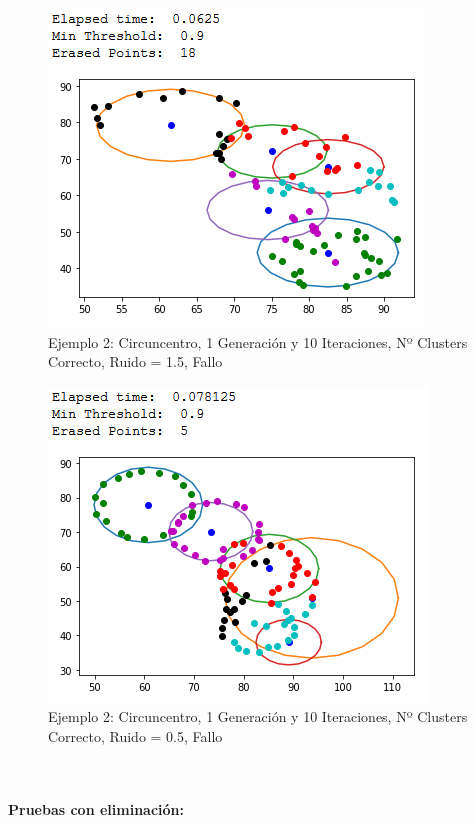 \documentclass[conference,a4paper]{IEEEtran}
\begin{document}
\begin{figure}[H]
\centering
\includegraphics[scale=0.65]{Experimentacion/Ejemplo2/ej2_c_1_10_mr_wrong}
\caption{Ejemplo 2: Circuncentro, 1 Generación y 10 Iteraciones,  Nº Clusters Correcto, Ruido = 1.5, Fallo\\}
\end{figure}

\begin{figure}[H]
\centering
\includegraphics[scale=0.65]{Experimentacion/Ejemplo2/ej2_c_1_10_lr_wrong}
\caption{Ejemplo 2: Circuncentro, 1 Generación y 10 Iteraciones,  Nº Clusters Correcto, Ruido = 0.5, Fallo\\\\\\}
\end{figure}

\textbf{Pruebas con eliminación:}\\
\end{document}
